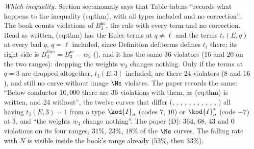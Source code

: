 \begin{sloppypar}
\begin{example}
\emph{Which inequality.} Section sec:anomaly says that Table tab:ns ``records what happens to the inequality (eq:thm), with all types included and no
correction''. The book counts violations of $B^{\mathrm{nc}}_3$, the rule with every term and no correction. Read as written, (eq:thm) has the Euler terms at $q\ne\ell$
and the terms $t_\ell(E,q)$ at every bad $q$, $q=\ell$ included, since Definition def:terms defines $t_\ell$ there; its right side is
$B^{\mathrm{thm}}_3=B^{\mathrm{nc}}_3-w_3$ (), and it has the same $36$ violators ($16$ and $20$ on the two ranges): dropping the
weights $w_3$ changes nothing. Only if the terms at $q=3$ are dropped altogether, $t_3(E,3)$ included, are there $24$ violators ($8$ and $16$), and still no
curve without image $\Ns$ violates. The paper records the same: ``Below conductor $10{,}000$ there are $36$ violations with them, as (eq:thm) is
written, and $24$ without'', the twelve curves that differ (, , , , , ,
, , , , , ) all having $t_3(E,3)=1$ from a type $\kod{I}_n$ (codes $7$, $10$) or
$\kod{I}_n^*$ (code $-7$) at $3$, and ``the weights $w_3$ change nothing''. The paper (D): $364$, $68$, $43$ and $0$ violations on its four ranges,
$31\%$, $23\%$, $18\%$ of the $\Ns$ curves. The falling rate with $N$ is visible inside the book's range already ($53\%$, then $33\%$).
\end{example}


\end{sloppypar}
